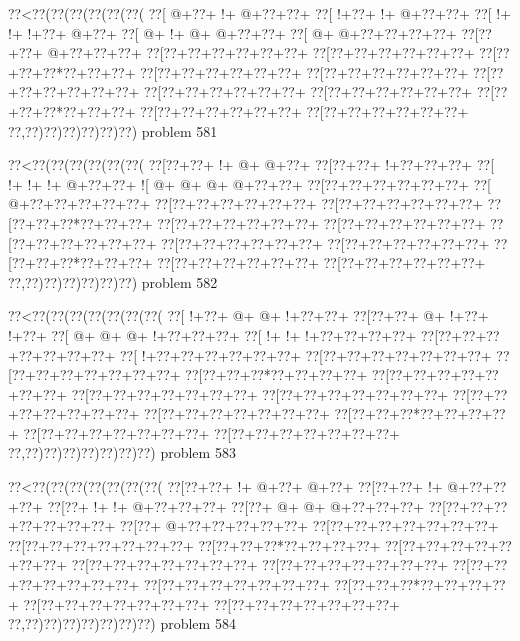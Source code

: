 \vbox{\vbox{\goo
\0??<\0??(\0??(\0??(\0??(\0??(\0??(
\0??[\- @+\0??+\- !+\- @+\0??+\0??+
\0??[\- !+\0??+\- !+\- @+\0??+\0??+
\0??[\- !+\- !+\- !+\0??+\- @+\0??+
\0??[\- @+\- !+\- @+\- @+\0??+\0??+
\0??[\- @+\- @+\0??+\0??+\0??+\0??+
\0??[\0??+\0??+\- @+\0??+\0??+\0??+
\0??[\0??+\0??+\0??+\0??+\0??+\0??+
\0??[\0??+\0??+\0??+\0??+\0??+\0??+
\0??[\0??+\0??+\0??*\0??+\0??+\0??+
\0??[\0??+\0??+\0??+\0??+\0??+\0??+
\0??[\0??+\0??+\0??+\0??+\0??+\0??+
\0??[\0??+\0??+\0??+\0??+\0??+\0??+
\0??[\0??+\0??+\0??+\0??+\0??+\0??+
\0??[\0??+\0??+\0??+\0??+\0??+\0??+
\0??[\0??+\0??+\0??*\0??+\0??+\0??+
\0??[\0??+\0??+\0??+\0??+\0??+\0??+
\0??[\0??+\0??+\0??+\0??+\0??+\0??+
\0??,\0??)\0??)\0??)\0??)\0??)\0??)
}
\hfil problem 581\hfil\break
}

\vbox{\vbox{\goo
\0??<\0??(\0??(\0??(\0??(\0??(\0??(
\0??[\0??+\0??+\- !+\- @+\- @+\0??+
\0??[\0??+\0??+\- !+\0??+\0??+\0??+
\0??[\- !+\- !+\- !+\- @+\0??+\0??+
\- ![\- @+\- @+\- @+\- @+\0??+\0??+
\0??[\0??+\0??+\0??+\0??+\0??+\0??+
\0??[\- @+\0??+\0??+\0??+\0??+\0??+
\0??[\0??+\0??+\0??+\0??+\0??+\0??+
\0??[\0??+\0??+\0??+\0??+\0??+\0??+
\0??[\0??+\0??+\0??*\0??+\0??+\0??+
\0??[\0??+\0??+\0??+\0??+\0??+\0??+
\0??[\0??+\0??+\0??+\0??+\0??+\0??+
\0??[\0??+\0??+\0??+\0??+\0??+\0??+
\0??[\0??+\0??+\0??+\0??+\0??+\0??+
\0??[\0??+\0??+\0??+\0??+\0??+\0??+
\0??[\0??+\0??+\0??*\0??+\0??+\0??+
\0??[\0??+\0??+\0??+\0??+\0??+\0??+
\0??[\0??+\0??+\0??+\0??+\0??+\0??+
\0??,\0??)\0??)\0??)\0??)\0??)\0??)
}
\hfil problem 582\hfil\break
}

\vbox{\vbox{\goo
\0??<\0??(\0??(\0??(\0??(\0??(\0??(\0??(
\0??[\- !+\0??+\- @+\- @+\- !+\0??+\0??+
\0??[\0??+\0??+\- @+\- !+\0??+\- !+\0??+
\0??[\- @+\- @+\- @+\- !+\0??+\0??+\0??+
\0??[\- !+\- !+\- !+\0??+\0??+\0??+\0??+
\0??[\0??+\0??+\0??+\0??+\0??+\0??+\0??+
\0??[\- !+\0??+\0??+\0??+\0??+\0??+\0??+
\0??[\0??+\0??+\0??+\0??+\0??+\0??+\0??+
\0??[\0??+\0??+\0??+\0??+\0??+\0??+\0??+
\0??[\0??+\0??+\0??*\0??+\0??+\0??+\0??+
\0??[\0??+\0??+\0??+\0??+\0??+\0??+\0??+
\0??[\0??+\0??+\0??+\0??+\0??+\0??+\0??+
\0??[\0??+\0??+\0??+\0??+\0??+\0??+\0??+
\0??[\0??+\0??+\0??+\0??+\0??+\0??+\0??+
\0??[\0??+\0??+\0??+\0??+\0??+\0??+\0??+
\0??[\0??+\0??+\0??*\0??+\0??+\0??+\0??+
\0??[\0??+\0??+\0??+\0??+\0??+\0??+\0??+
\0??[\0??+\0??+\0??+\0??+\0??+\0??+\0??+
\0??,\0??)\0??)\0??)\0??)\0??)\0??)\0??)
}
\hfil problem 583\hfil\break
}

\vbox{\vbox{\goo
\0??<\0??(\0??(\0??(\0??(\0??(\0??(\0??(
\0??[\0??+\0??+\- !+\- @+\0??+\- @+\0??+
\0??[\0??+\0??+\- !+\- @+\0??+\0??+\0??+
\0??[\0??+\- !+\- !+\- @+\0??+\0??+\0??+
\0??[\0??+\- @+\- @+\- @+\0??+\0??+\0??+
\0??[\0??+\0??+\0??+\0??+\0??+\0??+\0??+
\0??[\0??+\- @+\0??+\0??+\0??+\0??+\0??+
\0??[\0??+\0??+\0??+\0??+\0??+\0??+\0??+
\0??[\0??+\0??+\0??+\0??+\0??+\0??+\0??+
\0??[\0??+\0??+\0??*\0??+\0??+\0??+\0??+
\0??[\0??+\0??+\0??+\0??+\0??+\0??+\0??+
\0??[\0??+\0??+\0??+\0??+\0??+\0??+\0??+
\0??[\0??+\0??+\0??+\0??+\0??+\0??+\0??+
\0??[\0??+\0??+\0??+\0??+\0??+\0??+\0??+
\0??[\0??+\0??+\0??+\0??+\0??+\0??+\0??+
\0??[\0??+\0??+\0??*\0??+\0??+\0??+\0??+
\0??[\0??+\0??+\0??+\0??+\0??+\0??+\0??+
\0??[\0??+\0??+\0??+\0??+\0??+\0??+\0??+
\0??,\0??)\0??)\0??)\0??)\0??)\0??)\0??)
}
\hfil problem 584\hfil\break
}

